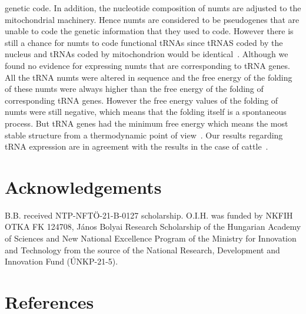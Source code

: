 \documentclass[a4paper,12pt]{article}
\numberwithin{equation}{section} %
\begin{document}
genetic code. In addition, the nucleotide composition of numts are adjusted to the mitochondrial machinery. Hence numts are considered to be pseudogenes that are unable to code the genetic information that they used to code. However there is still a chance for numts to code functional tRNAs since tRNAS coded by the nucleus and tRNAs coded by mitochondrion would be identical~. Although we found no evidence for expressing numts that are corresponding to tRNA genes. All the tRNA numts were altered in sequence and the free energy of the folding of these numts were always higher than the free energy of the folding of corresponding tRNA genes. However the free energy values of the folding of numts were still negative, which means that the folding itself is a spontaneous process. But tRNA genes had the minimum free energy which means the most stable structure from a thermodynamic point of view~. Our results regarding tRNA expression are in agreement with the results in the case of cattle~.
\section{Acknowledgements}
\indent B.B. received NTP-NFTÖ-21-B-0127 scholarship. O.I.H. was funded by NKFIH OTKA FK 124708, János Bolyai Research Scholarship of the Hungarian Academy of Sciences and New National Excellence Program of the Ministry for Innovation and Technology from the source of the National Research, Development and Innovation Fund (ÚNKP-21-5).
\section{References}
\renewcommand{\refname}{}


\end{document}
